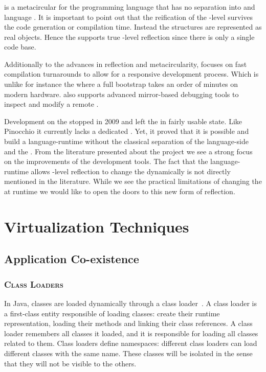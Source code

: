 \subsubsection*{\Klein \VM}

 is a metacircular \VM for the \Self programming language that has no separation into \VM and language \cite{Unga05a}.
It is important to point out that the reification of the \VM-level survives the code generation or compilation time.
Instead the \VM structures are represented as real \Self objects.
Hence the \Klein \VM supports true \VM-level reflection since there is only a single code base.

Additionally to the advances in reflection and metacircularity, \Klein focuses on fast compilation turnarounds to allow for a responsive development process.
Which is unlike for instance the \Squeak \VM where a full \VM bootstrap takes an order of minutes on modern hardware.
\Klein also supports advanced mirror-based debugging tools to inspect and modify a remote \VM.

Development on the \Klein \VM stopped in 2009 and left the \Klein \VM in fairly usable state.
Like Pinocchio it currently lacks a dedicated \GC.
Yet, it proved that it is possible and build a language-runtime without the classical separation of the language-side and the \VM.
From the literature presented about the \Klein project we see a strong focus on the improvements of the development tools.
The fact that the language-runtime allows \VM-level reflection to change the \VM dynamically is not directly mentioned in the literature.
While we see the practical limitations of changing the \VM at runtime we would like to open the doors to this new form of reflection.

\section{Virtualization Techniques}


\subsection{Application Co-existence}

\subsubsection*{\textsc{Class Loaders}}
In Java, classes are loaded dynamically through a class loader~\cite{Lian98a}. A class loader is a first-class entity responsible of loading classes: create their runtime representation, loading their methods and linking their class references. A class loader remembers all classes it loaded, and it is responsible for loading all classes related to  them. Class loaders define namespaces: different class loaders can load different classes with the same name. These classes will be isolated in the sense that they will not be visible to the others.

